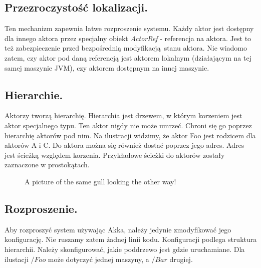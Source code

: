 \documentclass[oneside, 11pt, a4paper]{article}
\begin{document}
\begin{multicols}{2}
\subsection{Przezroczystość lokalizacji.}
Ten mechanizm zapewnia łatwe rozproszenie systemu. Każdy aktor jest dostępny dla innego aktora przez specjalny obiekt \emph{ActorRef} - referencja na aktora. Jest to też zabezpieczenie przed bezpośrednią modyfikacją stanu aktora. Nie wiadomo zatem, czy aktor pod daną referencją jest aktorem lokalnym (działającym na tej samej maszynie JVM), czy aktorem dostępnym na innej maszynie.

\subsection{Hierarchie.}
Aktorzy tworzą hierarchię. Hierarchia jest drzewem, w którym korzeniem jest aktor specjalnego typu. Ten aktor nigdy nie może umrzeć. Chroni się go poprzez hierarchię aktorów pod nim. Na ilustracji widzimy, że aktor Foo jest rodzicem dla aktorów A i C. Do aktora można się również dostać poprzez jego adres. Adres jest ścieżką względem korzenia. Przykładowe ścieżki do aktorów zostały zaznaczone w prostokątach.


 \begin{figure}[H]
  \begin{center}
  \caption{A picture of the same gull
           looking the other way!}
  \end{center}
  
\end{figure}

\subsection{Rozproszenie.}
Aby rozproszyć system używając \mbox{Akka}, należy jedynie zmodyfikować jego konfigurację. Nie ruszamy zatem żadnej linii kodu. Konfiguracji podlega struktura hierarchii. Należy skonfigurować, jakie poddrzewo jest gdzie uruchamiane. Dla ilustacji $/Foo$ może dotyczyć jednej maszyny, a $/Bar$ drugiej. 


\end{multicols}
\end{document}
